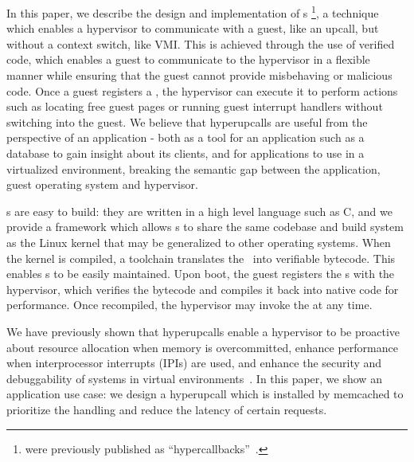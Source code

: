 \documentclass[11pt]{article}
\begin{document}
In this paper, we describe the design and implementation of \hypercallback{}s
\footnote{ were previously published as
	``hypercallbacks''~\cite{amit2017hypercallbacks}.}, 
a technique which enables a hypervisor to communicate with a guest, like an upcall,
but without a context switch, like VMI. This is achieved through the use of verified
code, which enables a guest to communicate to the hypervisor in a flexible manner
while ensuring that the guest cannot provide misbehaving or malicious 
code. Once a guest registers a \hypercallback, the hypervisor can execute
it to perform actions such as locating free guest pages or running guest interrupt handlers
without switching into the guest. We believe that hyperupcalls are useful from the perspective
of an application - both as a tool for an application such as a database to gain insight about 
its clients, and for applications to use in a virtualized environment, breaking the semantic gap
between the application, guest operating system and hypervisor. 

\Hypercallback{}s are easy to build: they are written in a high level language such as C,
and we provide a 
framework which allows \hypercallback{}s to share the same codebase and 
build system as the Linux kernel that may be generalized to other operating systems. 
When the kernel is compiled, a toolchain translates the \hypercallback~into 
verifiable bytecode. This enables \hypercallback{}s to be easily maintained. 
Upon boot, the guest registers the \hypercallback{}s with the hypervisor, 
which verifies the bytecode and compiles it back into native 
code for performance. Once recompiled, the hypervisor may invoke the \hypercallback{} at any time.

We have previously shown that hyperupcalls enable a hypervisor to be proactive about resource
allocation when memory is overcommitted, enhance performance when interprocessor interrupts (IPIs)
are used, and enhance the security and debuggability of systems in virtual environments~\cite{amit2018design}.
In this paper, we show an application use case: we design a hyperupcall which is installed by
memcached to prioritize the handling and reduce the latency of certain requests. 



\end{document}
